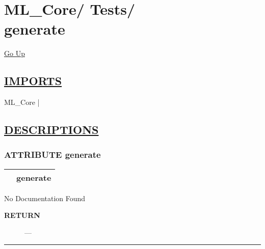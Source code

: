 \chapter*{\color{headfile}
{\large ML\_Core\slash\hspace{0pt}}
{\large Tests\slash\hspace{0pt}}
 \\
generate
}
\hypertarget{ecldoc:toc:ML_Core.Tests.generate}{}
\hyperlink{ecldoc:toc:root/ML_Core/Tests}{Go Up}

\section*{\underline{\textsf{IMPORTS}}}
\begin{doublespace}
{\large
ML\_Core |
}
\end{doublespace}

\section*{\underline{\textsf{DESCRIPTIONS}}}
\subsection*{\textsf{\colorbox{headtoc}{\color{white} ATTRIBUTE}
generate}}

\hypertarget{ecldoc:ml_core.tests.generate}{}

{\renewcommand{\arraystretch}{1.5}
\begin{tabularx}{\textwidth}{|>{\raggedright\arraybackslash}l|X|}
\hline
\hspace{0pt}\mytexttt{\color{red} } & \textbf{generate} \\
\hline
\end{tabularx}
}

\par





No Documentation Found








\par
\begin{description}
\item [\colorbox{tagtype}{\color{white} \textbf{\textsf{RETURN}}}] \textbf{} --- 
\end{description}




\rule{\linewidth}{0.5pt}
